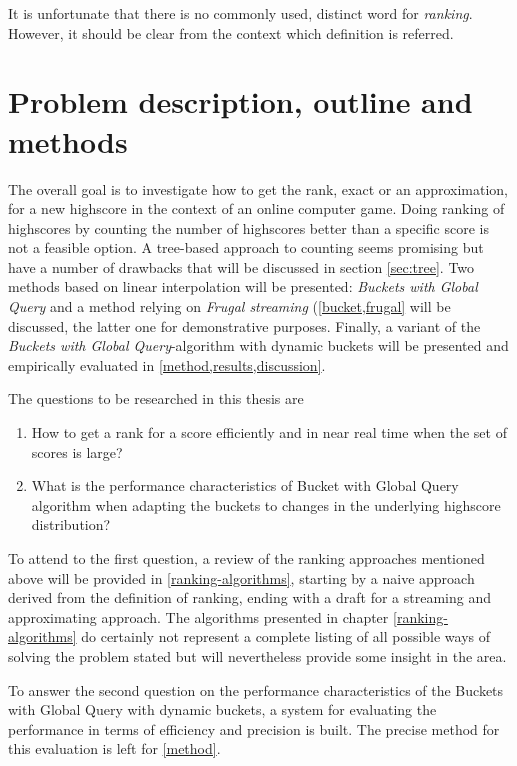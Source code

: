It is unfortunate that there is no commonly used, distinct word for \emph{ranking}. However, it should be clear from the context which definition is referred.

\section{Problem description, outline and methods}

The overall goal is to investigate how to get the rank, exact or an approximation, for a new highscore in the context of an online computer game. Doing ranking of highscores by counting the number of highscores better than a specific score is not a feasible option. A tree-based approach to counting seems promising but have a number of drawbacks that will be discussed in section \ref{sec:tree}. Two methods based on linear interpolation will be presented: \emph{Buckets with Global Query} and a method relying on \emph{Frugal streaming} (\cref{bucket,frugal} will be discussed, the latter one for demonstrative purposes. Finally, a variant of the \emph{Buckets with Global Query}-algorithm with dynamic buckets will be presented and empirically evaluated in \cref{method,results,discussion}.

The questions to be researched in this thesis are

\begin{enumerate}
  \setlength\itemsep{-0.4em}
\item How to get a rank for a score efficiently and in near real time when the set of scores is large?
\item What is the performance characteristics of Bucket with Global Query algorithm when adapting the buckets to changes in the underlying highscore distribution?
\end{enumerate}

To attend to the first question, a review of the ranking approaches mentioned above will be provided in \cref{ranking-algorithms}, starting by a naive approach derived from the definition of ranking, ending with a draft for a streaming and approximating approach. The algorithms presented in chapter \cref{ranking-algorithms} do certainly not represent a complete listing of all possible ways of solving the problem stated but will nevertheless provide some insight in the area.

To answer the second question on the performance characteristics of the Buckets with Global Query with dynamic buckets, a system for evaluating the performance in terms of efficiency and precision is built. The precise method for this evaluation is left for \cref{method}.
